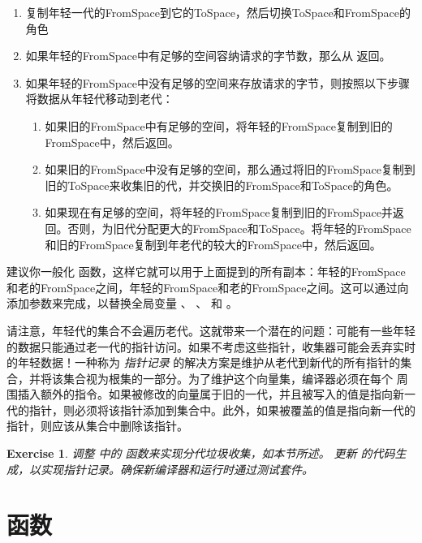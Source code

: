 \documentclass[11pt]{book}
\newtheorem{exercise}[theorem]{Exercise}
\begin{document}
\begin{enumerate}
\item 复制年轻一代的FromSpace到它的ToSpace，然后切换ToSpace和FromSpace的角色
\item 如果年轻的FromSpace中有足够的空间容纳请求的字节数，那么从  返回。
\item 如果年轻的FromSpace中没有足够的空间来存放请求的字节，则按照以下步骤将数据从年轻代移动到老代：
  \begin{enumerate}
  \item 如果旧的FromSpace中有足够的空间，将年轻的FromSpace复制到旧的FromSpace中，然后返回。
  \item 如果旧的FromSpace中没有足够的空间，那么通过将旧的FromSpace复制到旧的ToSpace来收集旧的代，并交换旧的FromSpace和ToSpace的角色。
  \item 如果现在有足够的空间，将年轻的FromSpace复制到旧的FromSpace并返回。否则，为旧代分配更大的FromSpace和ToSpace。将年轻的FromSpace和旧的FromSpace复制到年老代的较大的FromSpace中，然后返回。
  \end{enumerate}
\end{enumerate}

建议你一般化  函数，这样它就可以用于上面提到的所有副本：年轻的FromSpace和老的FromSpace之间，年轻的FromSpace和老的FromSpace之间。这可以通过向  添加参数来完成，以替换全局变量  、
 、  和  。

请注意，年轻代的集合不会遍历老代。这就带来一个潜在的问题：可能有一些年轻的数据只能通过老一代的指针访问。如果不考虑这些指针，收集器可能会丢弃实时的年轻数据！一种称为 \emph{指针记录} 的解决方案是维护从老代到新代的所有指针的集合，并将该集合视为根集的一部分。为了维护这个向量集，编译器必须在每个  周围插入额外的指令。如果被修改的向量属于旧的一代，并且被写入的值是指向新一代的指针，则必须将该指针添加到集合中。此外，如果被覆盖的值是指向新一代的指针，则应该从集合中删除该指针。

\begin{exercise}\normalfont
  调整  中的  函数来实现分代垃圾收集，如本节所述。
  更新  的代码生成，以实现指针记录。确保新编译器和运行时通过测试套件。
\end{exercise}


\chapter{函数}
\label{ch:Rfun}
\end{document}
